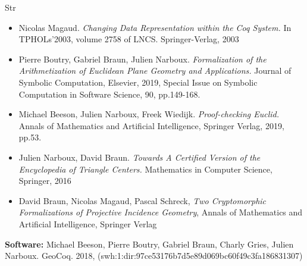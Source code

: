 \begin{sitedescription}{Str}

\begin{itemize}
\item Nicolas Magaud. \emph{Changing Data Representation within the Coq System.} In TPHOLs'2003, volume 2758 of LNCS. Springer-Verlag, 2003
\item Pierre Boutry, Gabriel Braun, Julien Narboux. \emph{Formalization of the Arithmetization of Euclidean Plane Geometry and Applications.} Journal of Symbolic Computation, Elsevier, 2019, Special Issue on Symbolic Computation in Software Science, 90, pp.149-168.
\item Michael Beeson, Julien Narboux, Freek Wiedijk. \emph{Proof-checking Euclid.} Annals of Mathematics and Artificial Intelligence, Springer Verlag, 2019, pp.53.
\item Julien Narboux, David Braun. \emph{Towards A Certified Version of the Encyclopedia of Triangle Centers.} Mathematics in Computer Science, Springer, 2016
\item David Braun, Nicolas Magaud, Pascal Schreck, \emph{Two Cryptomorphic Formalizations of Projective Incidence Geometry}, Annals of Mathematics and Artificial Intelligence, Springer Verlag
\end{itemize}

\textbf{Software:}
Michael Beeson, Pierre Boutry, Gabriel Braun, Charly Gries, Julien Narboux. GeoCoq. 2018, (swh:1:dir:97ce53176b7d5e89d069bc60f49c3fa186831307)

\end{sitedescription}

